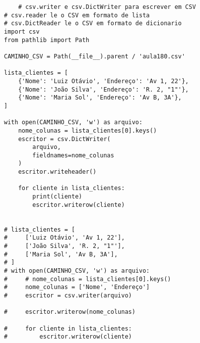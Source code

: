 \documentclass{article}
\begin{document}
\begin{lstlisting}
    # csv.writer e csv.DictWriter para escrever em CSV
# csv.reader le o CSV em formato de lista
# csv.DictReader le o CSV em formato de dicionario
import csv
from pathlib import Path

CAMINHO_CSV = Path(__file__).parent / 'aula180.csv'

lista_clientes = [
    {'Nome': 'Luiz Otávio', 'Endereço': 'Av 1, 22'},
    {'Nome': 'João Silva', 'Endereço': 'R. 2, "1"'},
    {'Nome': 'Maria Sol', 'Endereço': 'Av B, 3A'},
]

with open(CAMINHO_CSV, 'w') as arquivo:
    nome_colunas = lista_clientes[0].keys()
    escritor = csv.DictWriter(
        arquivo,
        fieldnames=nome_colunas
    )
    escritor.writeheader()

    for cliente in lista_clientes:
        print(cliente)
        escritor.writerow(cliente)


# lista_clientes = [
#     ['Luiz Otávio', 'Av 1, 22'],
#     ['João Silva', 'R. 2, "1"'],
#     ['Maria Sol', 'Av B, 3A'],
# ]
# with open(CAMINHO_CSV, 'w') as arquivo:
#     # nome_colunas = lista_clientes[0].keys()
#     nome_colunas = ['Nome', 'Endereço']
#     escritor = csv.writer(arquivo)

#     escritor.writerow(nome_colunas)

#     for cliente in lista_clientes:
#         escritor.writerow(cliente)
    
\end{lstlisting}
\end{document}
